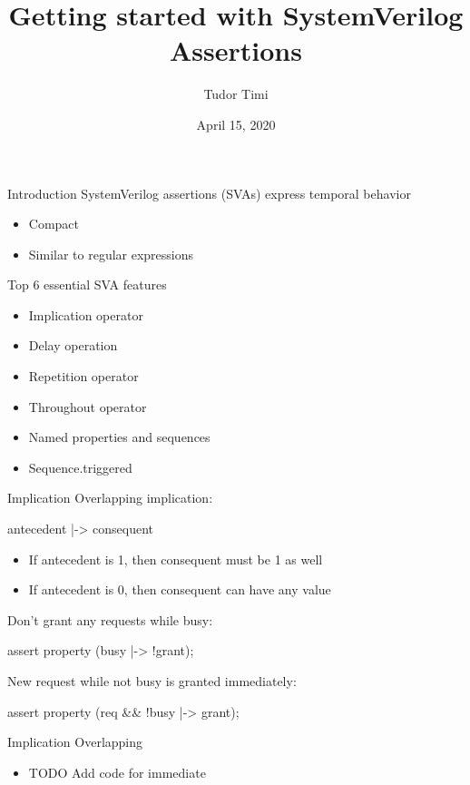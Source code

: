 \documentclass{beamer}
\title{Getting started with SystemVerilog Assertions}
\author{Tudor Timi}
\institute{VerificationGentleman.com}
\date{April 15, 2020}
\begin{document}
\begin{frame}
\titlepage
\end{frame}


\begin{frame}{Introduction}
SystemVerilog assertions (SVAs) express temporal behavior

\begin{itemize}
 \item Compact
 \item Similar to regular expressions
\end{itemize}
\end{frame}


\begin{frame}{Top 6 essential SVA features}
\begin{itemize}
 \item Implication operator
 \item Delay operation
 \item Repetition operator
 \item Throughout operator
 \item Named properties and sequences
 \item Sequence.triggered
\end{itemize}
\end{frame}


\begin{frame}{Implication}
Overlapping implication:

\begin{semiverbatim}
antecedent |-> consequent
\end{semiverbatim}

\begin{itemize}
 \item If antecedent is 1, then consequent must be 1 as well
 \item If antecedent is 0, then consequent can have any value
\end{itemize}

\pause
Don't grant any requests while busy:
\begin{semiverbatim}
assert property (busy |-> !grant);
\end{semiverbatim}

\pause
New request while not busy is granted immediately:
\begin{semiverbatim}
assert property (req \&\& !busy |-> grant);
\end{semiverbatim}
\end{frame}


\begin{frame}{Implication}
Overlapping

\begin{itemize}
 \item TODO Add code for immediate
\end{itemize}
\end{frame}
\end{document}
